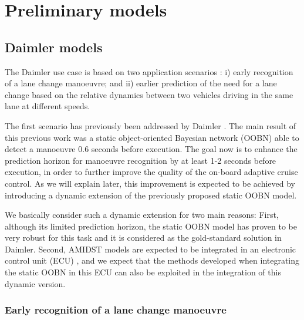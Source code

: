 \section{Preliminary models}\label{Section:PreliminaryModels}

\subsection{Daimler models}\label{Section:DaimlerModels}

The Daimler use case is based on two application scenarios \cite{Fer14}: i) early recognition of a lane change manoeuvre; and ii) earlier prediction of the need for a lane change based on the relative dynamics between two vehicles driving in the same lane at different speeds. 

The first scenario has previously been addressed by Daimler \cite{Kasper2011,kasper2012object,KasperThesis2013}. The main result of this previous work was a static object-oriented Bayesian network (OOBN) \cite{KollerPfeffer1997} able to detect a manoeuvre 0.6 seconds before execution. The goal now is to enhance the prediction horizon for manoeuvre recognition by at least 1-2 seconds before execution, in order to further improve the quality of the on-board adaptive cruise control. As we will explain later, this improvement is expected to be achieved by introducing a dynamic extension of the previously proposed static OOBN model. 

We basically consider such a dynamic extension for two main reasons: First, although its limited prediction horizon, the static OOBN model has proven to be very robust for this task and it is considered as the gold-standard solution in Daimler. Second, AMIDST models are expected to be integrated in an electronic control unit (ECU) \cite{Fer14}, and we expect that the methods developed when integrating the static OOBN in this ECU \cite{Weidl2014} can also be exploited in the integration of this dynamic version. 

\subsubsection{Early recognition of a lane change manoeuvre}\label{Section:Daimler:EarlyRecognition}

